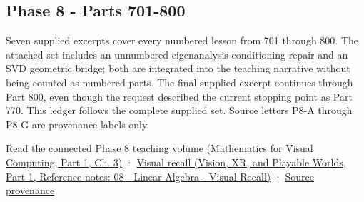 \subsection{Phase 8 - Parts 701-800}\label{appendix-fd090d982a15-phase-8---parts-701-800}

\hypertarget{appendix-fd090d982a15-phase-8---parts-701-800}{}

Seven supplied excerpts cover every numbered lesson from 701 through 800. The attached set includes an unnumbered eigenanalysis-conditioning repair and an SVD geometric bridge; both are integrated into the teaching narrative without being counted as numbered parts. The final supplied excerpt continues through Part 800, even though the request described the current stopping point as Part 770. This ledger follows the complete supplied set. Source letters P8-A through P8-G are provenance labels only.

\href{../02-Mathematics-for-Visual-Computing-P01/main.pdf\#nameddest=01-foundations-i-ch019-the-graphics-problem-hiding-inside-a-matrix-equation}{Read the connected Phase 8 teaching volume (Mathematics for Visual Computing, Part 1, Ch. 3)} · \href{../07-Vision-XR-and-Playable-Worlds-P01/main.pdf\#nameddest=appendix-932cf7182ff1}{Visual recall (Vision, XR, and Playable Worlds, Part 1, Reference notes: 08 - Linear Algebra - Visual Recall)} · \hyperref[appendix-a103e7846d21-phase-8---source-analysis-and-verification]{Source provenance}

